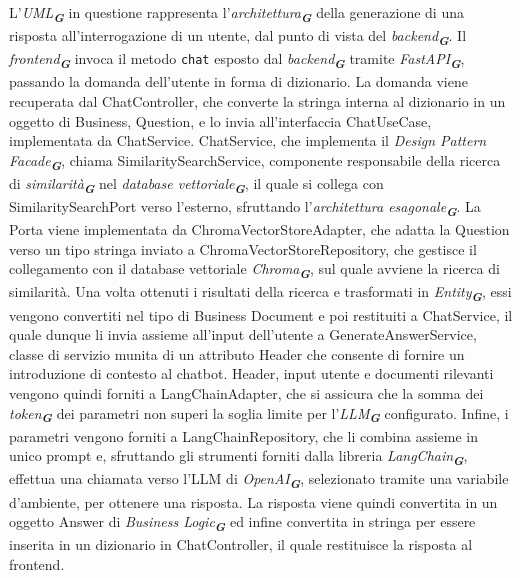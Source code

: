 L'\emph{UML}\textsubscript{\textbf{\textit{G}}} in questione rappresenta l'\emph{architettura}\textsubscript{\textbf{\textit{G}}} della generazione di una risposta all'interrogazione di un utente, dal punto di vista del \emph{backend}\textsubscript{\textbf{\textit{G}}}.
Il \emph{frontend}\textsubscript{\textbf{\textit{G}}} invoca il metodo \texttt{chat} esposto dal \emph{backend}\textsubscript{\textbf{\textit{G}}} tramite \emph{FastAPI}\textsubscript{\textbf{\textit{G}}}, passando la domanda dell'utente in forma di dizionario.
La domanda viene recuperata dal ChatController, che converte la stringa interna al dizionario in un oggetto di Business, Question, e lo invia all'interfaccia ChatUseCase, implementata da ChatService.
ChatService, che implementa il \emph{Design Pattern} \emph{Facade}\textsubscript{\textbf{\textit{G}}}, chiama SimilaritySearchService, componente responsabile della ricerca di \emph{similarità}\textsubscript{\textbf{\textit{G}}} nel \emph{database vettoriale}\textsubscript{\textbf{\textit{G}}}, il quale si collega con SimilaritySearchPort verso l'esterno, sfruttando l'\emph{architettura esagonale}\textsubscript{\textbf{\textit{G}}}. La Porta viene implementata da ChromaVectorStoreAdapter, che adatta la Question verso un tipo stringa inviato a ChromaVectorStoreRepository, che gestisce il collegamento con il database vettoriale \emph{Chroma}\textsubscript{\textbf{\textit{G}}}, sul quale avviene la ricerca di similarità. Una volta ottenuti i risultati della ricerca e trasformati in \emph{Entity}\textsubscript{\textbf{\textit{G}}}, essi vengono convertiti nel tipo di Business Document e poi restituiti a ChatService, il quale dunque li invia assieme all'input dell'utente a GenerateAnswerService, classe di servizio munita di un attributo Header che consente di fornire un introduzione di contesto al chatbot. Header, input utente e documenti rilevanti vengono quindi forniti a LangChainAdapter, che si assicura che la somma dei \emph{token}\textsubscript{\textbf{\textit{G}}} dei parametri non superi la soglia limite per l'\emph{LLM}\textsubscript{\textbf{\textit{G}}} configurato. Infine, i parametri vengono forniti a LangChainRepository, che li combina assieme in unico prompt e, sfruttando gli strumenti forniti dalla libreria \emph{LangChain}\textsubscript{\textbf{\textit{G}}}, effettua una chiamata verso l'LLM di \emph{OpenAI}\textsubscript{\textbf{\textit{G}}}, selezionato tramite una variabile d'ambiente, per ottenere una risposta. 
La risposta viene quindi convertita in un oggetto Answer di \emph{Business Logic}\textsubscript{\textbf{\textit{G}}} ed infine convertita in stringa per essere inserita in un dizionario in ChatController, il quale restituisce la risposta al frontend.

